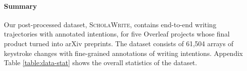 \paragraph{Summary}
Our post-processed dataset, \textsc{ScholaWrite}, contains end-to-end writing trajectories with annotated intentions, for five Overleaf projects whose final product turned into arXiv preprints. 
The dataset consists of 61,504 arrays of keystroke changes with fine-grained annotations of writing intentions. 
Appendix Table \ref{table:data-stat} shows the overall statistics of the dataset.






